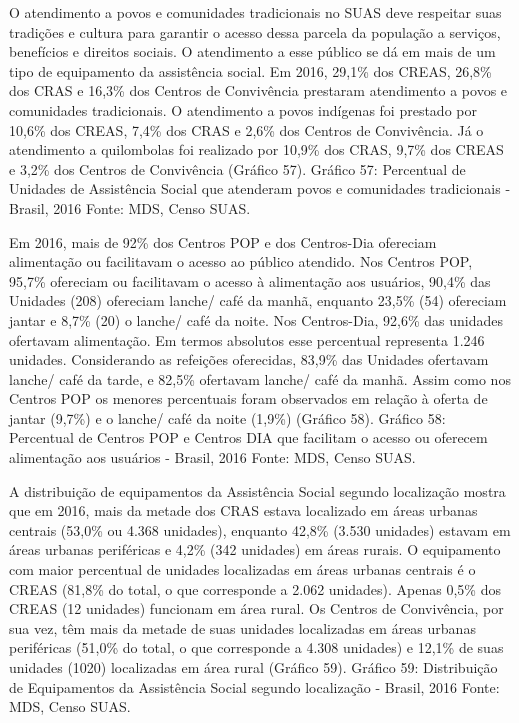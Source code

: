 \documentclass[
  brazilian]{report}
\begin{document}
O atendimento a povos e comunidades tradicionais no SUAS deve respeitar
suas tradições e cultura para garantir o acesso dessa parcela da
população a serviços, benefícios e direitos sociais. O atendimento a
esse público se dá em mais de um tipo de equipamento da assistência
social. Em 2016, 29,1\% dos CREAS, 26,8\% dos CRAS e 16,3\% dos Centros
de Convivência prestaram atendimento a povos e comunidades tradicionais.
O atendimento a povos indígenas foi prestado por 10,6\% dos CREAS, 7,4\%
dos CRAS e 2,6\% dos Centros de Convivência. Já o atendimento a
quilombolas foi realizado por 10,9\% dos CRAS, 9,7\% dos CREAS e 3,2\%
dos Centros de Convivência (Gráfico 57). Gráfico 57: Percentual de
Unidades de Assistência Social que atenderam povos e comunidades
tradicionais - Brasil, 2016 Fonte: MDS, Censo SUAS.

Em 2016, mais de 92\% dos Centros POP e dos Centros-Dia ofereciam
alimentação ou facilitavam o acesso ao público atendido. Nos Centros
POP, 95,7\% ofereciam ou facilitavam o acesso à alimentação aos
usuários, 90,4\% das Unidades (208) ofereciam lanche/ café da manhã,
enquanto 23,5\% (54) ofereciam jantar e 8,7\% (20) o lanche/ café da
noite. Nos Centros-Dia, 92,6\% das unidades ofertavam alimentação. Em
termos absolutos esse percentual representa 1.246 unidades. Considerando
as refeições oferecidas, 83,9\% das Unidades ofertavam lanche/ café da
tarde, e 82,5\% ofertavam lanche/ café da manhã. Assim como nos Centros
POP os menores percentuais foram observados em relação à oferta de
jantar (9,7\%) e o lanche/ café da noite (1,9\%) (Gráfico 58). Gráfico
58: Percentual de Centros POP e Centros DIA que facilitam o acesso ou
oferecem alimentação aos usuários - Brasil, 2016 Fonte: MDS, Censo SUAS.

A distribuição de equipamentos da Assistência Social segundo localização
mostra que em 2016, mais da metade dos CRAS estava localizado em áreas
urbanas centrais (53,0\% ou 4.368 unidades), enquanto 42,8\% (3.530
unidades) estavam em áreas urbanas periféricas e 4,2\% (342 unidades) em
áreas rurais. O equipamento com maior percentual de unidades localizadas
em áreas urbanas centrais é o CREAS (81,8\% do total, o que corresponde
a 2.062 unidades). Apenas 0,5\% dos CREAS (12 unidades) funcionam em
área rural. Os Centros de Convivência, por sua vez, têm mais da metade
de suas unidades localizadas em áreas urbanas periféricas (51,0\% do
total, o que corresponde a 4.308 unidades) e 12,1\% de suas unidades
(1020) localizadas em área rural (Gráfico 59). Gráfico 59: Distribuição
de Equipamentos da Assistência Social segundo localização - Brasil, 2016
Fonte: MDS, Censo SUAS.
\end{document}
